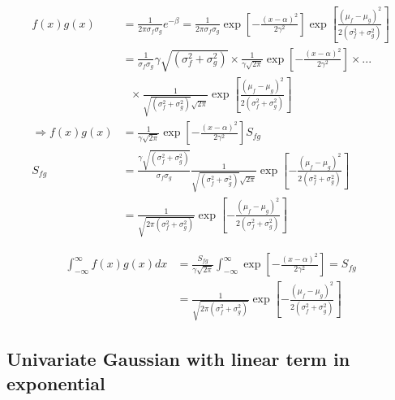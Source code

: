 \documentclass[/home/jesse/Analysis/FemtoAnalysis/AnalysisNotes/AnalysisNoteJBuxton.tex]{subfiles}
\begin{document}
\vspace{10mm}

\begin{equation}
\begin{aligned}
f(x)g(x) &= \frac{1}{2\pi\sigma_{f}\sigma_{g}}e^{-\beta} = \frac{1}{2\pi\sigma_{f}\sigma_{g}}\exp \left[ -\frac{(x-\alpha)^{2}}{2\gamma^{2}} \right] \exp \left[ \frac{(\mu_{f}-\mu_{g})^{2}}{2(\sigma_{f}^{2}+\sigma_{g}^{2})} \right] \\
&= \frac{1}{\sigma_{f}\sigma_{g}}\gamma\sqrt{(\sigma_{f}^{2}+\sigma_{g}^{2})} \times \frac{1}{\gamma\sqrt{2\pi}}\exp \left[ -\frac{(x-\alpha)^{2}}{2\gamma^{2}} \right] \times ... \\
&~~~\times \frac{1}{\sqrt{(\sigma_{f}^{2}+\sigma_{g}^{2})}\sqrt{2\pi}}\exp \left[ \frac{(\mu_{f}-\mu_{g})^{2}}{2(\sigma_{f}^{2}+\sigma_{g}^{2})} \right] \\
\Rightarrow f(x)g(x) &= \frac{1}{\gamma\sqrt{2\pi}}\exp \left[ -\frac{(x-\alpha)^{2}}{2\gamma^{2}} \right]S_{fg} \\
S_{fg} &= \frac{\gamma\sqrt{(\sigma_{f}^{2}+\sigma_{g}^{2})}}{\sigma_{f}\sigma_{g}} \frac{1}{\sqrt{(\sigma_{f}^{2}+\sigma_{g}^{2})}\sqrt{2\pi}}\exp \left[ -\frac{(\mu_{f}-\mu_{g})^{2}}{2(\sigma_{f}^{2}+\sigma_{g}^{2})} \right] \\
&= \frac{1}{\sqrt{2\pi(\sigma_{f}^{2}+\sigma_{g}^{2})}}\exp \left[ -\frac{(\mu_{f}-\mu_{g})^{2}}{2(\sigma_{f}^{2}+\sigma_{g}^{2})} \right]
\end{aligned}
\label{eqn:ProdGauss5}
\end{equation}

\vspace{10mm}

\begin{equation}
\begin{aligned}
\int_{-\infty}^{\infty}f(x)g(x)dx &= \frac{S_{fg}}{\gamma\sqrt{2\pi}}\int_{-\infty}^{\infty}\exp \left[ -\frac{(x-\alpha)^{2}}{2\gamma^{2}} \right] = S_{fg} \\
&= \frac{1}{\sqrt{2\pi(\sigma_{f}^{2}+\sigma_{g}^{2})}}\exp \left[ -\frac{(\mu_{f}-\mu_{g})^{2}}{2(\sigma_{f}^{2}+\sigma_{g}^{2})} \right]
\end{aligned}
\label{eqn:ProdGauss6}
\end{equation}


\subsection{Univariate Gaussian with linear term in exponential}
\end{document}
